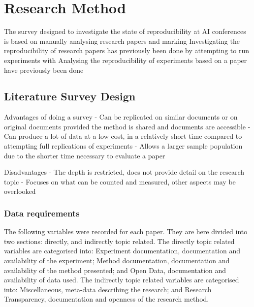 
\chapter{Research Method}

The survey designed to investigate the state of reproducibility at AI conferences is based on manually analysing research papers and marking
Investigating the reproducibility of research papers has previously been done by attempting to run experiments with
Analysing the reproducibility of experiments based on a paper have previously been done

\section{Literature Survey Design}

Advantages of doing a survey
- Can be replicated on similar documents or on original documents provided the method is shared and documents are accessible
- Can produce a lot of data at a low cost, in a relatively short time compared to attempting full replications of experiments
- Allows a larger sample population due to the shorter time necessary to evaluate a paper

Disadvantages
- The depth is restricted, does not provide detail on the research topic
- Focuses on what can be counted and measured, other aspects may be overlooked

\subsection{Data requirements}
\label{subsec:data-req}

The following variables were recorded for each paper. They are here divided into two sections: directly, and indirectly topic related. The directly topic related variables are categorised into: Experiment documentation, documentation and availability of the experiment; Method documentation, documentation and availability of the method presented; and Open Data, documentation and availability of data used. The indirectly topic related variables are categorised into: Miscellaneous, meta-data describing the research; and Research Transparency, documentation and openness of the research method.

